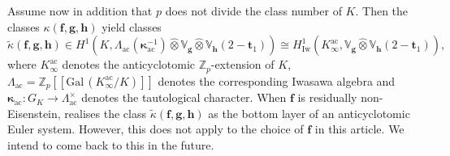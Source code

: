 \documentclass[a4paper,11pt]{amsart}
\theoremstyle{plain}
\theoremstyle{definition}
\theoremstyle{remark}
\newcommand{\bb}{\mathbb}
\DeclareMathOperator{\ac}{ac}
\newcommand{\Gal}{\mathrm{Gal\,}}
\newcommand{\hf}{{\mathbf{f}}}
\newcommand{\hg}{{\mathbf{g}}}
\newcommand{\hh}{{\mathbf h}}
\numberwithin{equation}{section}
\begin{document}
Assume now in addition that $p$ does not divide the class number of $K$. Then the classes $\kappa(\hf,\hg,\hh)$ yield classes
\[
\tilde{\kappa}(\hf,\hg,\hh)\in H^1(K,\Lambda_{\ac}(\bm{\kappa}_{\ac}^{-1})\hat{\otimes} \bb{V}_\hg \hat{\otimes} \bb{V}_\hh (2-\mathbf{t}_1)) \cong H^1_{\mathrm{Iw}}(K_\infty^{\ac},\bb{V}_\hg\hat{\otimes}\bb{V}_{\hh}(2-\mathbf{t}_1)),
\]
where $K_\infty^{\ac}$ denotes the anticyclotomic $\bb{Z}_p$-extension of $K$, $\Lambda_{\ac}=\bb{Z}_p[[\Gal(K_\infty^{\ac}/K)]]$ denotes the corresponding Iwasawa algebra and $\bm{\kappa}_{\ac}:G_K\rightarrow \Lambda_{\ac}^\times$ denotes the tautological character. When $\hf$ is residually non-Eisenstein, \cite{ACR} realises the class $\tilde{\kappa}(\hf,\hg,\hh)$ as the bottom layer of an anticyclotomic Euler system. However, this does not apply to the choice of $\hf$ in this article. We intend to come back to this in the future.



\end{document}
